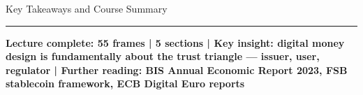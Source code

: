 \documentclass[8pt,aspectratio=169]{beamer}
\newcommand{\bottomnote}[1]{\vfill\vspace{-2mm}\textcolor{mllavender2}{\rule{\textwidth}{0.4pt}}\vspace{1mm}\footnotesize\textbf{#1}}
\begin{document}
\begin{frame}{Key Takeaways and Course Summary}
\bottomnote{Lecture complete: 55 frames | 5 sections | Key insight: digital money design is fundamentally about the trust triangle --- issuer, user, regulator | Further reading: BIS Annual Economic Report 2023, FSB stablecoin framework, ECB Digital Euro reports}
\end{frame}
\end{document}

